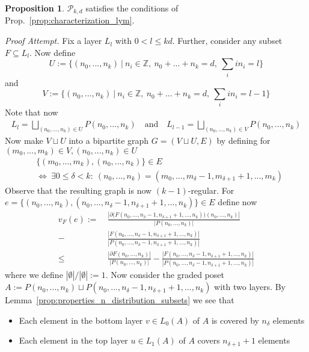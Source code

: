\documentclass{scrartcl}
\newcommand{\Z}{\mathbb{Z}}
\theoremstyle{definition}
\newtheorem{proposition}[definition]{Proposition}
\begin{document}
\begin{proposition}
    $\mathcal{P}_{k, d}$ satisfies the conditions of Prop.~\ref{prop:characterization_lym}.
\end{proposition}
\textit{Proof Attempt.}
Fix a layer $L_l$ with $0 < l \leq kd$.
Further, consider any subset $F \subseteq L_l$.
Now define
\begin{equation*}
    U := \{ (n_0, ..., n_k) \ | \ n_i \in \Z, \ n_0 + ... + n_k = d, \ \sum_i i n_i = l \}
\end{equation*}
and
\begin{equation*}
    V := \{ (n_0, ..., n_k) \ | \ n_i \in \Z, \ n_0 + ... + n_k = d, \ \sum_i i n_i = l - 1 \}
\end{equation*}
Note that now
\begin{align*}
    L_l = \bigsqcup_{(n_0, ..., n_k) \in U} P(n_0, ..., n_k) \quad \text{and} \quad L_{l - 1} = \bigsqcup_{(n_0, ..., n_k) \in V} P(n_0, ..., n_k)
\end{align*}
Now make $V \sqcup U$ into a bipartite graph $G = (V \sqcup U, E)$ by defining for $(m_0, ..., m_k) \in V, (n_0, ..., n_k) \in U$
\begin{align*}
    &\{ (m_0, ..., m_k), (n_0, ..., n_k) \} \in E \\
    &\Leftrightarrow \ \exists 0 \leq \delta < k: \ (n_0, ..., n_k) = (m_0, ..., m_\delta - 1, m_{\delta + 1} + 1, ..., m_k)
\end{align*}
Observe that the resulting graph is now $(k - 1)$-regular.
For $e = \{ (n_0, ..., n_k), (n_0, ..., n_\delta - 1, n_{\delta + 1} + 1, ..., n_k) \} \in E$ define now
\begin{align*}
    v_F(e) := \ &\frac {|\partial \bigl(F(n_0, ..., n_\delta - 1, n_{\delta + 1} + 1, ..., n_k)\bigr)(n_0, ..., n_k)|} {|P(n_0, ..., n_k)|} \\
    - &\frac {|F(n_0, ..., n_\delta - 1, n_{\delta + 1} + 1, ..., n_k)|} {|P(n_0, ..., n_\delta - 1, n_{\delta + 1} + 1, ..., n_k)|} \\
    \leq& \frac {|\partial F(n_0, ..., n_k)|} {|P(n_0, ..., n_k)|} - \frac {|F(n_0, ..., n_\delta - 1, n_{\delta + 1} + 1, ..., n_k)|} {|P(n_0, ..., n_\delta - 1, n_{\delta + 1} + 1, ..., n_k)|}
\end{align*}
where we define $|\emptyset|/|\emptyset| := 1$.
Now consider the graded poset $A := P(n_0, ..., n_k) \sqcup P(n_0, ..., n_\delta - 1, n_{\delta + 1} + 1, ..., n_k)$ with two layers.
By Lemma~\ref{prop:properties_n_distribution_subsets} we see that
\begin{itemize}
    \item Each element in the bottom layer $v \in L_0(A)$ of $A$ is covered by $n_\delta$ elements
    \item Each element in the top layer $u \in L_1(A)$ of $A$ covers $n_{\delta + 1} + 1$ elements
\end{itemize}
\end{document}
